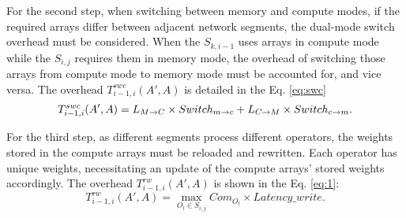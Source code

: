 For the second step, when switching between memory and compute modes, if the required arrays differ between adjacent network segments, the dual-mode switch overhead must be considered. When the $S_{k,i-1}$ uses arrays in compute mode while the $S_{i,j}$ requires them in memory mode, the overhead of switching those arrays from compute mode to memory mode must be accounted for, and vice versa. The overhead $T_{i-1,i}^{swc}(A',A)$ is detailed in the Eq. \ref{eq:swc}\
\begin{equation}
    \scriptsize 
    T_{i-1,i}^{swc}(A',A) =
        L_{M\to C}\times Switch_{m \to c} +
        L_{C\to M}\times Switch_{c \to m}.
    \label{eq:swc}
\end{equation}

For the third step, as different segments process different operators, the weights stored in the compute arrays must be reloaded and rewritten. 
Each operator has unique weights, necessitating an update of the compute arrays' stored weights accordingly.
The overhead $T_{i-1,i}^{rw}(A',A)$ is shown in the Eq. \ref{eq:1}:
\begin{equation}
  T_{i-1,i}^{rw}(A',A) =\textstyle \max_{O_l \in S_{i,j}}{Com_{O_l}\times Latency\_write}.
  \label{eq:1}
\end{equation}

